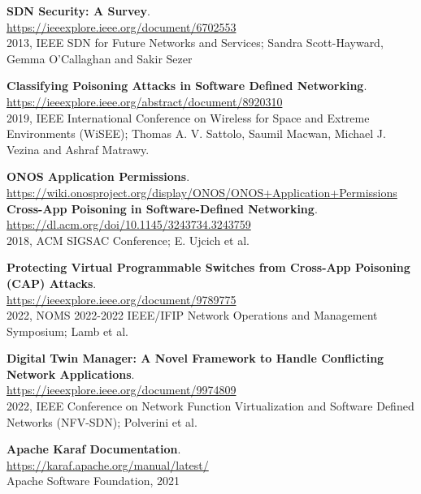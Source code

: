 \documentclass[a4paper,10pt]{memoir}
\begin{document}
{\begin{thebibliography}{9}
  \textbf{SDN Security: A Survey}.\\
  \href{https://ieeexplore.ieee.org/document/6702553}{https://ieeexplore.ieee.org/document/6702553}\\
  2013, IEEE SDN for Future Networks and Services; Sandra Scott-Hayward, Gemma O’Callaghan and Sakir Sezer

  \textbf{Classifying Poisoning Attacks in Software Defined Networking}.\\
  \href{https://ieeexplore.ieee.org/abstract/document/8920310}{https://ieeexplore.ieee.org/abstract/document/8920310}\\
  2019, IEEE International Conference on Wireless for Space and Extreme Environments (WiSEE); Thomas A. V. Sattolo, Saumil Macwan, Michael J. Vezina and Ashraf Matrawy.
 
  \textbf{ONOS Application Permissions}.\\
  \href{https://wiki.onosproject.org/display/ONOS/ONOS+Application+Permissions}{https://wiki.onosproject.org/display/ONOS/ONOS+Application+Permissions}\\

  \textbf{Cross-App Poisoning in Software-Defined Networking}.\\
  \href{https://dl.acm.org/doi/10.1145/3243734.3243759}{https://dl.acm.org/doi/10.1145/3243734.3243759}\\
  2018, ACM SIGSAC Conference; E. Ujcich et al.

  \textbf{Protecting Virtual Programmable Switches from Cross-App Poisoning (CAP) Attacks}.\\
  \href{https://ieeexplore.ieee.org/document/9789775}{https://ieeexplore.ieee.org/document/9789775}\\
  2022, NOMS 2022-2022 IEEE/IFIP Network Operations and Management Symposium; Lamb et al.

  \textbf{Digital Twin Manager: A Novel Framework to Handle Conflicting Network Applications}.\\
  \href{https://ieeexplore.ieee.org/document/9974809}{https://ieeexplore.ieee.org/document/9974809}\\
  2022, IEEE Conference on Network Function Virtualization and Software Defined Networks (NFV-SDN); Polverini et al.

  \textbf{Apache Karaf Documentation}.\\
  \href{https://karaf.apache.org/manual/latest/}{https://karaf.apache.org/manual/latest/}\\
  Apache Software Foundation, 2021


\end{thebibliography}}
\end{document}
